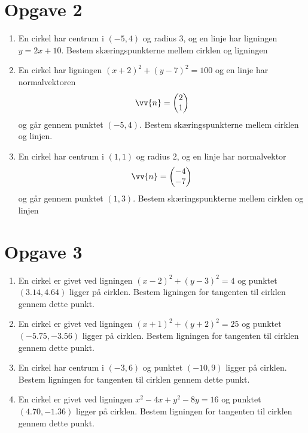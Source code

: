 \section*{Opgave 2}
\begin{enumerate}[label=\roman*)]
	\item En cirkel har centrum i $(-5,4)$ og radius $3$, og en linje har ligningen $y = 2x+10$. Bestem skæringspunkterne mellem cirklen og ligningen
	\item En cirkel har ligningen $(x+2)^2+(y-7)^2 = 100$ og en linje har normalvektoren 
	\begin{align*}
		\vv{n} =
		\begin{pmatrix}
			2 \\ 1
		\end{pmatrix}
	\end{align*}
	og går gennem punktet $(-5,4)$. Bestem skæringspunkterne mellem cirklen og linjen. 
	\item En cirkel har centrum i $(1,1)$ og radius $2$, og en linje har normalvektor 
	\begin{align*}
		\vv{n} =
		\begin{pmatrix}
			-4 \\ -7			
		\end{pmatrix}
	\end{align*}
	og går gennem punktet $(1,3)$. Bestem skæringspunkterne mellem cirklen og linjen
\end{enumerate}

\section*{Opgave 3}
\begin{enumerate}[label=\roman*)]
	\item	En cirkel er givet ved ligningen $(x-2)^2 + (y-3)^2 = 4$ og punktet $(3.14,4.64)$
	ligger på cirklen. Bestem ligningen for tangenten til cirklen gennem dette punkt.
	\item	En cirkel er givet ved ligningen $(x+1)^2 + (y+2)^2 = 25$ og punktet
	 $(-5.75,-3.56)$
	ligger på cirklen. Bestem ligningen for tangenten til cirklen gennem dette punkt.	
	\item	En cirkel har centrum i $(-3,6)$ og punktet
	 $(-10,9)$
	ligger på cirklen. Bestem ligningen for tangenten til cirklen gennem dette punkt.	
	\item	En cirkel er givet ved ligningen $x^2-4x+y^2-8y=16$ og punktet
	 $(4.70,-1.36)$
	ligger på cirklen. Bestem ligningen for tangenten til cirklen gennem dette punkt.	
\end{enumerate}
